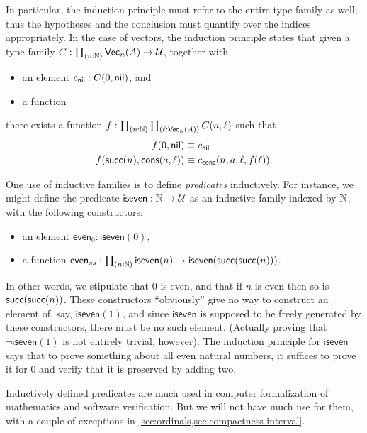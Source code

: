 In particular, the induction principle must refer to the entire type family as well; thus the hypotheses and the conclusion must quantify over the indices appropriately.
In the case of vectors, the induction principle states that given a type family $C:\prd{n:\nat} \vect n A \to \type$, together with
\begin{itemize}
\item an element $c_{\mathsf{nil}} : C(0,\mathsf{nil})$, and
\item a function 
\end{itemize}
there exists a function $f:\prd{n:\nat}{\ell:\vect n A} C(n,\ell)$ such that
\begin{align*}
  f(0,\mathsf{nil}) &\equiv c_{\mathsf{nil}}\\
  f(\mathsf{succ}(n),\mathsf{cons}(a,\ell)) &\equiv c_{\mathsf{cons}}(n,a,\ell,f(\ell)).
\end{align*}

%
%
One use of inductive families is to define \emph{predicates} inductively.
For instance, we might define the predicate $\mathsf{iseven}:\mathbb{N}\to\mathcal{U}$ as an inductive family indexed by $\mathbb{N}$, with the following constructors:
\begin{itemize}
\item an element $\mathsf{even}_0 : \mathsf{iseven}(0)$,
\item a function $\mathsf{even}_{ss} : \prd{n:\nat} \mathsf{iseven}(n) \to \mathsf{iseven}(\suc(\suc(n)))$.
\end{itemize}
In other words, we stipulate that $0$ is even, and that if $n$ is even then so is $\mathsf{succ}(\mathsf{succ}(n))$.
These constructors ``obviously'' give no way to construct an element of, say, $\mathsf{iseven}(1)$, and since $\mathsf{iseven}$ is supposed to be freely generated by these constructors, there must be no such element.
(Actually proving that $\neg \mathsf{iseven}(1)$ is not entirely trivial, however).
The induction principle for $\mathsf{iseven}$ says that to prove something about all even natural numbers, it suffices to prove it for $0$ and verify that it is preserved by adding two.

%
Inductively defined predicates are much used in computer formalization of mathematics and software verification.
But we will not have much use for them, with a couple of exceptions in \cref{sec:ordinals,sec:compactness-interval}.

